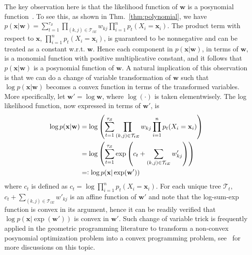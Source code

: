 \documentclass{article} %
\theoremstyle{definition}
\newcommand{\eqdef}{=\vcentcolon}
\begin{document}
The key observation here is that the likelihood function of $\mathbf{w}$ is a posynomial function~\cite{boyd2007tutorial}. To see this, as shown in Thm.~\ref{thm:polynomial}, we have $p(\mathbf{x}|\mathbf{w}) = \sum_{t=1}^{\tau_\mathcal{S}}\prod_{(k, j)\in\mathcal{T}_{tE}}w_{kj}\prod_{i=1}^n p_t(X_i = \mathbf{x}_i)$. The product term with respect to $\mathbf{x}$, $\prod_{i=1}^n p_t(X_i = \mathbf{x}_i)$, is guaranteed to be nonnegative and can be treated as a constant w.r.t. $\mathbf{w}$. Hence each component in $p(\mathbf{x}|\mathbf{w})$, in terms of $\mathbf{w}$, is a monomial function with positive multiplicative constant, and it follows that $p(\mathbf{x}|\mathbf{w})$ is a posynomial function of $\mathbf{w}$. A natural implication of this observation is that we can do a change of variable transformation of $\mathbf{w}$ such that $\log p(\mathbf{x}|\mathbf{w})$ becomes a convex function in terms of the transformed variables. More specifically, let $\mathbf{w}' = \log\mathbf{w}$, where $\log(\cdot)$ is taken elementwisely. The log likelihood function, now expressed in terms of $\mathbf{w}'$, is
\begin{align}
\log p(\mathbf{x}|\mathbf{w}) & = \log\left(\sum_{t=1}^{\tau_\mathcal{S}}\prod_{(k, j)\in\mathcal{T}_{tE}}w_{kj}\prod_{i=1}^n p_t(X_i = \mathbf{x}_i)\right) \nonumber\\ 
& = \log\left(\sum_{t=1}^{\tau_\mathcal{S}}\exp\left(c_t + \sum_{(k, j)\in \mathcal{T}_{tE}}w'_{kj}\right)\right) \nonumber\\
& \eqdef \log p(\mathbf{x}|\exp(\mathbf{w}'))
\end{align}
where $c_t$ is defined as $c_t = \log\prod_{i=1}^n p_t(X_i = \mathbf{x}_i)$. For each unique tree $\mathcal{T}_t$, $c_t + \sum_{(k, j)\in \mathcal{T}_{tE}}w'_{kj}$ is an affine function of $\mathbf{w}'$ and note that the log-sum-exp function is convex in its argument, hence it can be readily verified that $\log p(\mathbf{x}|\exp(\mathbf{w}'))$ is convex in $\mathbf{w}'$. Such change of variable trick is frequently applied in the geometric programming literature to transform a non-convex posynomial optimization problem into a convex programming problem, see~\cite{boyd2007tutorial,chiang2005geometric} for more discussions on this topic. 
\end{document}
